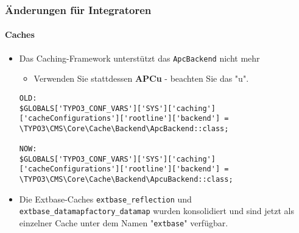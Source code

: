 \begin{frame}[fragile]
	\frametitle{Änderungen für Integratoren}
	\framesubtitle{Caches}

	\lstset{basicstyle=\tiny\ttfamily}

	\begin{itemize}
		\item Das Caching-Framework unterstützt das \texttt{ApcBackend} nicht mehr

			\begin{itemize}\smaller
				\item[\ding{228}] Verwenden Sie stattdessen \textbf{APCu}  - beachten Sie das "u".
			\end{itemize}

\begin{lstlisting}
OLD:
$GLOBALS['TYPO3_CONF_VARS']['SYS']['caching']['cacheConfigurations']['rootline']['backend'] =
\TYPO3\CMS\Core\Cache\Backend\ApcBackend::class;

NOW:
$GLOBALS['TYPO3_CONF_VARS']['SYS']['caching']['cacheConfigurations']['rootline']['backend'] =
\TYPO3\CMS\Core\Cache\Backend\ApcuBackend::class;
\end{lstlisting}

		\item Die Extbase-Caches \texttt{extbase\_reflection} und \texttt{extbase\_datamapfactory\_datamap}
			wurden konsolidiert und sind jetzt als einzelner Cache unter dem Namen "\texttt{extbase}" verfügbar.

	\end{itemize}

\end{frame}



